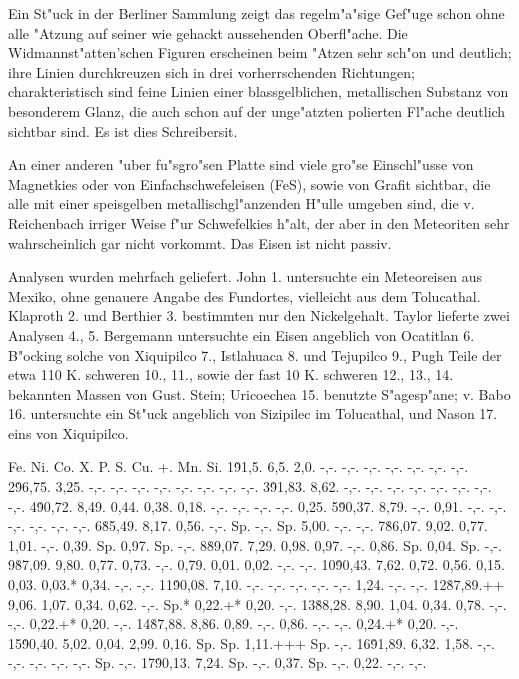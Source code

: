 \documentclass[a4paper, 11pt, oneside]{article}
\begin{document}
Ein St"uck in der Berliner Sammlung zeigt das regelm"a"sige Gef"uge schon ohne alle "Atzung auf seiner wie gehackt aussehenden Oberfl"ache. Die Widmannst"atten'schen Figuren erscheinen beim "Atzen sehr sch"on und deutlich; ihre Linien durchkreuzen sich in drei vorherrschenden Richtungen; charakteristisch sind feine Linien einer blassgelblichen, metallischen Substanz von besonderem Glanz, die auch schon auf der unge"atzten polierten Fl"ache deutlich sichtbar sind. Es ist dies Schreibersit.

An einer anderen "uber fu"sgro"sen Platte sind viele gro"se Einschl"usse von Magnetkies oder von Einfachschwefeleisen (FeS), sowie von Grafit sichtbar, die alle mit einer speisgelben metallischgl"anzenden H"ulle umgeben sind, die v. Reichenbach irriger Weise f"ur Schwefelkies h"alt, der aber in den Meteoriten sehr wahrscheinlich gar nicht vorkommt. Das Eisen ist nicht passiv.

Analysen wurden mehrfach geliefert. John 1. untersuchte ein Meteoreisen aus Mexiko, ohne genauere Angabe des Fundortes, vielleicht aus dem Tolucathal. Klaproth 2. und Berthier 3. bestimmten nur den Nickelgehalt. Taylor lieferte zwei Analysen 4., 5. Bergemann untersuchte ein Eisen angeblich von Ocatitlan 6. B"ocking solche von Xiquipilco 7., Istlahuaca 8. und Tejupilco 9., Pugh Teile der etwa 110 K. schweren 10., 11., sowie der fast 10 K. schweren 12., 13., 14. bekannten Massen von Gust. Stein; Uricoechea 15. benutzte S"agesp"ane; v. Babo 16. untersuchte ein St"uck angeblich von Sizipilec im Tolucathal, und Nason 17. eins von Xiquipilco.

Fe. Ni. Co. X. P. S. Cu. +. Mn. Si.  
1\. 91,5. 6,5. 2,0. -,-. -,-. -,-. -,-. -,-. -,-. -,-.  
2\. 96,75. 3,25. -,-. -,-. -,-. -,-. -,-. -,-. -,-. -,-.  
3\. 91,83. 8,62. -,-. -,-. -,-. -,-. -,-. -,-. -,-. -,-.  
4\. 90,72. 8,49. 0,44. 0,38. 0,18. -,-. -,-. -,-. -,-. 0,25.  
5\. 90,37. 8,79. -,-. 0,91. -,-. -,-. -,-. -,-. -,-. -,-.  
6\. 85,49. 8,17. 0,56. -,-. Sp. -,-. Sp. 5,00. -,-. -,-.  
7\. 86,07. 9,02. 0,77. 1,01. -,-. 0,39. Sp. 0,97. Sp. -,-.  
8\. 89,07. 7,29. 0,98. 0,97. -,-. 0,86. Sp. 0,04. Sp. -,-.  
9\. 87,09. 9,80. 0,77. 0,73. -,-. 0,79. 0,01. 0,02. -,-. -,-.  
10\. 90,43. 7,62. 0,72. 0,56. 0,15. 0,03. 0,03.* 0,34. -,-. -,-.  
11\. 90,08. 7,10. -,-. -,-. -,-. -,-. -,-. 1,24. -,-. -,-.  
12\. 87,89.++ 9,06. 1,07. 0,34. 0,62. -,-. Sp.* 0,22.+* 0,20. -,-.  
13\. 88,28. 8,90. 1,04. 0,34. 0,78. -,-. -,-. 0,22.+* 0,20. -,-.  
14\. 87,88. 8,86. 0,89. -,-. 0,86. -,-. -,-. 0,24.+* 0,20. -,-.  
15\. 90,40. 5,02. 0,04. 2,99. 0,16. Sp. Sp. 1,11.+++ Sp. -,-.  
16\. 91,89. 6,32. 1,58. -,-. -,-. -,-. -,-. -,-. Sp. -,-.  
17\. 90,13. 7,24. Sp. -,-. 0,37. Sp. -,-. 0,22. -,-. -,-.
\end{document}
